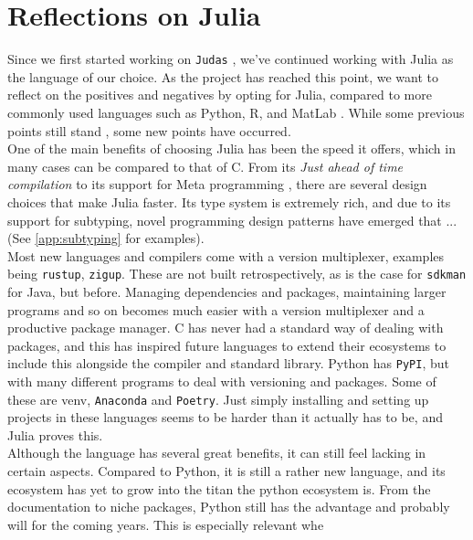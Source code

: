 \section*{Reflections on Julia}
\label{sec:juliaref}

Since we first started working on \texttt{Judas} \cite{projthesis}, we've continued working with Julia as the language of our choice. As the project has reached this point, we want to reflect on the positives and negatives by opting for Julia, compared to more commonly used languages such as Python, R, and MatLab \cite{matlabpyr}. While some previous points still stand \cite{projthesis}, some new points have occurred. \\

One of the main benefits of choosing Julia has been the speed it offers, which in many cases can be compared to that of C. From its \textit{Just ahead of time compilation} to its support for Meta programming \cite{whyjulia} \cite{julia}, there are several design choices that make Julia faster. Its type system is extremely rich, and due to its support for subtyping, novel programming design patterns have emerged that ... (See \ref{app:subtyping} for examples). \\ 

Most new languages and compilers come with a version multiplexer, examples being \texttt{rustup}, \texttt{zigup}. These are not built retrospectively, as is the case for \texttt{sdkman} for Java, but before. Managing dependencies and packages, maintaining larger programs and so on becomes much easier with a version multiplexer and a productive package manager. C has never had a standard way of dealing with packages, and this has inspired future languages to extend their ecosystems to include this alongside the compiler and standard library. Python has \texttt{PyPI}, but with many different programs to deal with versioning and packages. Some of these are venv, \texttt{Anaconda} and \texttt{Poetry}. Just simply installing and setting up projects in these languages seems to be harder than it actually has to be, and Julia proves this. \\ 


Although the language has several great benefits, it can still feel lacking in certain aspects. Compared to Python, it is still a rather new language, and its ecosystem has yet to grow into the titan the python ecosystem is. From the documentation to niche packages, Python still has the advantage and probably will for the coming years. This is especially relevant whe \\


